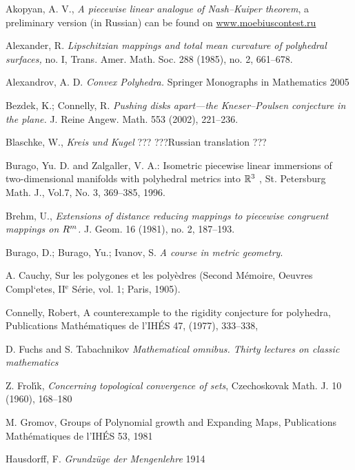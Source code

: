 \begin{thebibliography}{52}
 Akopyan, A. V.,
\textit{A piecewise linear analogue of Nash--Kuiper theorem},
a preliminary version (in Russian) can be found on
\href{http://www.moebiuscontest.ru/files/2007/akopyan.pdf}{www.moebiuscontest.ru}

 Alexander, R. 
\textit{Lipschitzian mappings and total mean curvature of polyhedral surfaces,} 
no. I, Trans. Amer. Math. Soc. 288 (1985), no. 2, 661--678.


 Alexandrov, A. D. \textit{Convex Polyhedra.} Springer Monographs in Mathematics 2005

 Bezdek, K.;  Connelly, R. 
\textit{Pushing disks apart---the Kneser--Poulsen conjecture in the plane.}  
J. Reine Angew. Math.  553  (2002), 221--236.

 Blaschke, W., \textit{Kreis und Kugel} ???
???Russian translation ??? 

Burago, Yu. D. and Zalgaller, V. A.: Isometric piecewise linear immersions of two-dimensional manifolds with polyhedral metrics into $\mathbb{R}^3$
, St. Petersburg Math. J., Vol.7, No. 3, 369--385, 1996.

 Brehm, U., \textit{Extensions of distance reducing mappings to piecewise congruent mappings on $R\sp{m}$.}  J. Geom.  16  (1981), no. 2, 187--193.

  Burago, D.;  Burago, Yu.;  Ivanov, S. \textit{A course in metric geometry}.

 A. Cauchy, Sur les polygones et les poly\`{e}dres (Second M\'emoire, Oeuvres  Compl`{e}tes, II$^\mathrm{e}$
S\'erie, vol. 1; Paris, 1905).

Connelly, Robert, A counterexample to the rigidity conjecture for polyhedra, 
Publications Math\'ematiques de l'IH\'ES 47, (1977), 333--338,


 D. Fuchs and S. Tabachnikov \textit{Mathematical omnibus. Thirty lectures on classic mathematics} 

 Z. Frol\'{\i}k, \textit{Concerning topological convergence of sets}, Czechoskovak Math. J. 10 (1960), 168--180

M. Gromov, Groups of Polynomial growth and Expanding Maps, Publications Math\'ematiques de l'IH\'ES 53, 1981

 Hausdorff, F. \textit{Grundz\"uge der Mengenlehre} 1914


\end{thebibliography}
